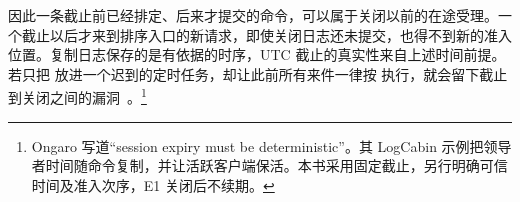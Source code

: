 
因此一条截止前已经排定、后来才提交的命令，可以属于关闭以前的在途受理。一个截止以后才来到排序入口的新请求，即使关闭日志还未提交，也得不到新的准入位置。复制日志保存的是有依据的时序，UTC 截止的真实性来自上述时间前提。若只把  放进一个迟到的定时任务，却让此前所有来件一律按  执行，就会留下截止到关闭之间的漏洞~\cite{ongaro}。\footnote{Ongaro 写道“session expiry must be deterministic”。其 LogCabin 示例把领导者时间随命令复制，并让活跃客户端保活。本书采用固定截止，另行明确可信时间及准入次序，E1 关闭后不续期。}
\FloatBarrier
